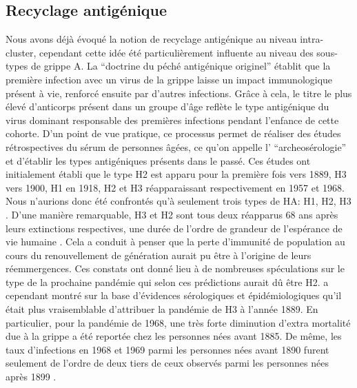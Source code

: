 \subsection{Recyclage antigénique}
\label{sec:intro:recyclage}

Nous avons déjà évoqué la notion de recyclage antigénique au niveau
intra-cluster, cependant cette idée été particulièrement influente au
niveau des sous-types de grippe A.  La ``doctrine du péché antigénique
originel'' \citep{Francis1960} établit que la première infection avec
un virus de la grippe laisse un impact immunologique présent à vie,
renforcé ensuite par d'autres infections.  Grâce à cela, le titre le
plus élevé d'anticorps présent dans un groupe d'âge reflète le type
antigénique du virus dominant responsable des premières infections
pendant l'enfance de cette cohorte. D'un point de vue pratique, ce
processus permet de réaliser des études rétrospectives du sérum de
personnes âgées, ce qu'on appelle l' ``archeosérologie'' et d'établir
les types antigéniques présents dans le passé. Ces études ont
initialement établi que le type H2 est apparu pour la première fois
vers 1889, H3 vers 1900, H1 en 1918, H2 et H3 réapparaissant
respectivement en 1957 et 1968. Nous n'aurions donc été confrontés
qu'à seulement trois types de HA: H1, H2, H3 \citep{Dowdle1999}. D'une
manière remarquable, H3 et H2 sont tous deux réapparus 68 ans après
leurs extinctions respectives, une durée de l'ordre de grandeur de
l'espérance de vie humaine \citep{Hilleman2002}. Cela a conduit à
penser que la perte d'immunité de population au cours du
renouvellement de génération aurait pu être à l'origine de leurs
réemmergences. Ces constats ont donné lieu à de nombreuses
spéculations sur le type de la prochaine pandémie qui selon ces
prédictions aurait dû être H2. \citet{Dowdle1999} a cependant montré
sur la base d'évidences sérologiques et épidémiologiques qu'il était
plus vraisemblable d'attribuer la pandémie de H3 à l'année 1889. En
particulier, pour la pandémie de 1968, une très forte diminution
d'extra mortalité due à la grippe a été reportée chez les personnes
nées avant 1885.  De même, les taux d'infections en 1968 et 1969 parmi
les personnes nées avant 1890 furent seulement de l'ordre de deux
tiers de ceux observés parmi les personnes nées après 1899
\citep{Dowdle2006}.


